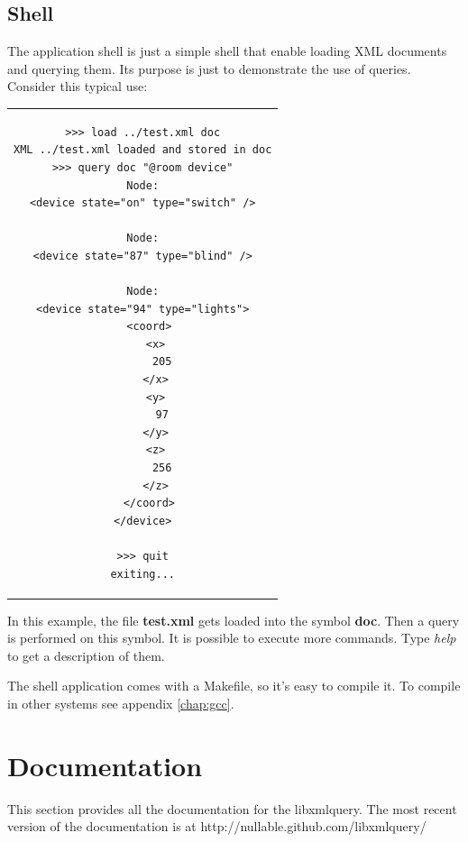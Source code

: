 \documentclass[a4paper]{report}
\begin{document}
	\section{Shell}
		The application shell is just a simple shell that enable loading XML documents and querying them. Its purpose is just to demonstrate the use of queries. Consider this typical use:

\begin{center}
\lstset{language=bash,caption=Typical usage of the shell application. The banner was intentionally removed., captionpos=b}
\begin{tabular}{c}
\begin{lstlisting}		
>>> load ../test.xml doc
XML ../test.xml loaded and stored in doc
>>> query doc "@room device"
Node:
<device state="on" type="switch" />

Node:
<device state="87" type="blind" />

Node:
<device state="94" type="lights">
  <coord>
    <x>
      205
    </x>
    <y>
      97
    </y>
    <z>
      256
    </z>
  </coord>
</device>

>>> quit
exiting...
\end{lstlisting}
\end{tabular}
\end{center}
		
		In this example, the file \textbf{test.xml} gets loaded into the symbol \textbf{doc}. Then a query is performed on this symbol. It is possible to execute more commands. Type \emph{help} to get a description of them.
		
		The shell application comes with a Makefile, so it's easy to compile it. To compile in other systems see appendix \ref{chap:gcc}.
		
\chapter{Documentation}\label{chap:doc}
	This section provides all the documentation for the libxmlquery. The most recent version of the documentation is at http://nullable.github.com/libxmlquery/
	
\end{document}
